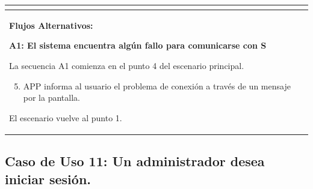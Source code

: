 \begin{longtable}{|l|p{5.5cm}|l|p{2cm}|l|p{1.9cm}|}
{    } \\ \hline

    \multicolumn{6}{|p{15cm}|}{ \textbf{Flujos Alternativos: }
    
    \textbf{A1: El sistema encuentra algún fallo para comunicarse con S}
    
    La secuencia A1 comienza en el punto 4 del escenario principal.
    \begin{enumerate}
        \setcounter{enumi}{4}
        \item APP informa al usuario el problema de conexión a través de un mensaje por la pantalla.
    \end{enumerate}

    El escenario vuelve al punto 1.

    } \\ \hline

\end{longtable}


\subsection{Caso de Uso 11: Un administrador desea iniciar sesión.}

